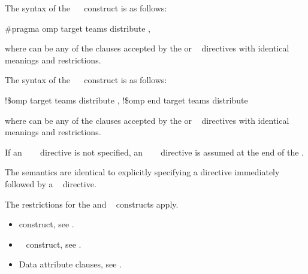 {{{{\syntax
\ccppspecificstart
The syntax of the ~~ construct is as follows:

\begin{boxedcode}
\#pragma omp target teams distribute \plc{[clause[ [},\plc{] clause] ... ] new-line}
\end{boxedcode}

where  can be any of the clauses accepted by the  or ~ directives 
with identical meanings and restrictions.
\ccppspecificend

\fortranspecificstart
The syntax of the ~~ construct is as follows:

\begin{boxedcode}
!\$omp target teams distribute \plc{[clause[ [},\plc{] clause] ... ]}
\plc{[}!\$omp end target teams distribute\plc{]}
\end{boxedcode}

where  can be any of the clauses accepted by the  or ~ directives 
with identical meanings and restrictions.

If an ~~~ directive is not specified, an 
~~~ directive is assumed at the end of the .
\fortranspecificend

\descr
The semantics are identical to explicitly specifying a  directive immediately 
followed by a ~ directive.

\restrictions
The restrictions for the  and ~ constructs apply.

\crossreferences
\begin{itemize}
\item {} construct, see 
.

\item {}~ construct, see 
.

\item Data attribute clauses, see 
.
\end{itemize}










}}}}
